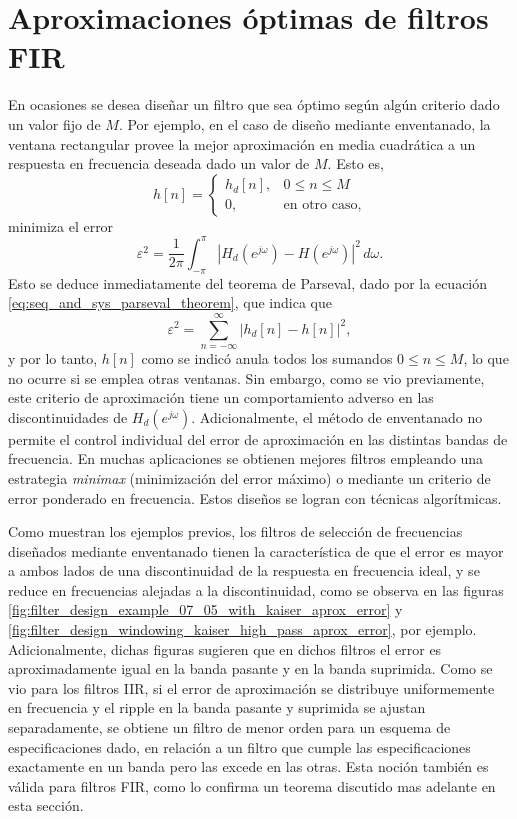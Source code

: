 \documentclass[a4paper]{report}
\begin{document}
\section{Aproximaciones óptimas de filtros FIR}\label{sec:filter_design_optimum_aproximation_fir}

En ocasiones se desea diseñar un filtro que sea óptimo según algún criterio dado un valor fijo de \(M\). Por ejemplo, en el caso de diseño mediante enventanado, la ventana rectangular provee la mejor aproximación en media cuadrática a un respuesta en frecuencia deseada dado un valor de \(M\). Esto es,
\[
 h[n]=
 \left\{ 
 \begin{array}{ll}
  h_d[n], & 0\leq n\leq M\\
  0, & \textrm{en otro caso,}
 \end{array}
 \right.
\]
minimiza el error 
\[
 \varepsilon^2=\frac{1}{2\pi}\int_{-\pi}^\pi|H_d(e^{j\omega})-H(e^{j\omega})|^2\,d\omega.
\]
Esto se deduce inmediatamente del teorema de Parseval, dado por la ecuación \ref{eq:seq_and_sys_parseval_theorem}, que indica que 
\[
 \varepsilon^2=\sum_{n=-\infty}^\infty|h_d[n]-h[n]|^2,
\]
y por lo tanto, \(h[n]\) como se indicó anula todos los sumandos \(0\leq n\leq M\), lo que no ocurre si se emplea otras ventanas. Sin embargo, como se vio previamente,  este criterio de aproximación tiene un comportamiento adverso en las discontinuidades de \(H_d(e^{j\omega})\). Adicionalmente, el método de enventanado no permite el control individual del error de aproximación en las distintas bandas de frecuencia. En muchas aplicaciones se obtienen mejores filtros empleando una estrategia \emph{minimax} (minimización del error máximo) o mediante un criterio de error ponderado en frecuencia. Estos diseños se logran con técnicas algorítmicas.

Como muestran los ejemplos previos, los filtros de selección de frecuencias diseñados mediante enventanado tienen la característica de que el error es mayor a ambos lados de una discontinuidad de la respuesta en frecuencia ideal, y se reduce en frecuencias alejadas a la discontinuidad, como se observa en las figuras \ref{fig:filter_design_example_07_05_with_kaiser_aprox_error} y \ref{fig:filter_design_windowing_kaiser_high_pass_aprox_error}, por ejemplo. Adicionalmente, dichas figuras sugieren que  en dichos filtros el error es aproximadamente igual en la banda pasante y en la banda suprimida. Como se vio para los filtros IIR, si el error de aproximación se distribuye uniformemente en frecuencia y el ripple en la banda pasante y suprimida se ajustan separadamente, se obtiene un filtro de menor orden para un esquema de especificaciones dado, en relación a un filtro que cumple las especificaciones exactamente en un banda pero las excede en las otras. Esta noción también es válida para filtros FIR, como lo confirma un teorema discutido mas adelante en esta sección.
\end{document}
